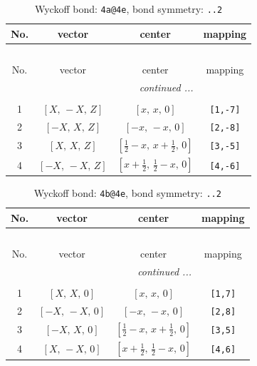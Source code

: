 \documentclass[fleqn,8pt]{jsarticle}
\begin{document}
\begin{longtable}{cccc}
\caption{Wyckoff bond: {\tt 4a@4e}, bond symmetry: {\tt ..2}}
 \\
 \hline \hline
No. & vector & center & mapping \\ \hline \endfirsthead

\multicolumn{3}{l}{\tablename\ \thetable{}} \\
 \hline \hline
No. & vector & center & mapping \\ \hline \endhead

 \hline \hline
\multicolumn{3}{r}{\footnotesize\it continued ...} \\ \endfoot

 \hline \hline
\multicolumn{3}{r}{} \\ \endlastfoot

1 & $\left[ X,\, - X,\, Z \right]$ & $\left[ x,\, x,\, 0 \right]$ & {\tt [1,-7]} \\ \hline
2 & $\left[ - X,\, X,\, Z \right]$ & $\left[ - x,\, - x,\, 0 \right]$ & {\tt [2,-8]} \\ \hline
3 & $\left[ X,\, X,\, Z \right]$ & $\left[ \frac{1}{2} - x,\, x + \frac{1}{2},\, 0 \right]$ & {\tt [3,-5]} \\ \hline
4 & $\left[ - X,\, - X,\, Z \right]$ & $\left[ x + \frac{1}{2},\, \frac{1}{2} - x,\, 0 \right]$ & {\tt [4,-6]} \\
\end{longtable}
\renewcommand{\arraystretch}{1.2}
\begin{longtable}{cccc}
\caption{Wyckoff bond: {\tt 4b@4e}, bond symmetry: {\tt ..2}}
 \\
 \hline \hline
No. & vector & center & mapping \\ \hline \endfirsthead

\multicolumn{3}{l}{\tablename\ \thetable{}} \\
 \hline \hline
No. & vector & center & mapping \\ \hline \endhead

 \hline \hline
\multicolumn{3}{r}{\footnotesize\it continued ...} \\ \endfoot

 \hline \hline
\multicolumn{3}{r}{} \\ \endlastfoot

1 & $\left[ X,\, X,\, 0 \right]$ & $\left[ x,\, x,\, 0 \right]$ & {\tt [1,7]} \\ \hline
2 & $\left[ - X,\, - X,\, 0 \right]$ & $\left[ - x,\, - x,\, 0 \right]$ & {\tt [2,8]} \\ \hline
3 & $\left[ - X,\, X,\, 0 \right]$ & $\left[ \frac{1}{2} - x,\, x + \frac{1}{2},\, 0 \right]$ & {\tt [3,5]} \\ \hline
4 & $\left[ X,\, - X,\, 0 \right]$ & $\left[ x + \frac{1}{2},\, \frac{1}{2} - x,\, 0 \right]$ & {\tt [4,6]} \\
\end{longtable}
\end{document}
